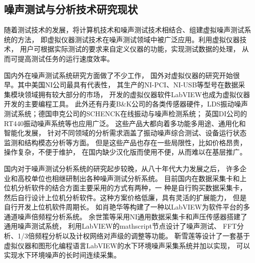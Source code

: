 \subsection{噪声测试与分析技术研究现状}
\begin{comment}
水下环境噪声数据采集装置对于水声试验来说是不可缺少的，因此设计
一套高性能的、能够适应水声信号特点的数据采集
系统十分必要。水声信号在水中传播时，水中的自然
环境极其复杂，要求所采用的数据采集器能够适应水下恶劣的自然环境，不但具有较大的动态范围，
所采集信号的幅度范围要尽可能宽，而且试验现场的数据量很大，常常需要多通道同步进行数据采集，
这样，对数据采集器提出了很高的要求。另外，从节约成本的角度考虑，又要求所采用的系统应该具有
一定的通用性和灵活的扩展能力。文中所要完成的
工作正是基于这一目的而展开的。

随着测试技术的发展，目前对传统的复杂仪器，分析方法的依赖性在减少，而正在流行着一种 
将计算机技术和噪声测试技术相结合、组建虚拟噪 
声测试系统的方法，即将虚拟仪器技术的测试技术 
引到噪声测试领域中，借助计算机软件技术来设计 
噪声分析软件。


\end{comment}
随着测试技术的发展，将计算机技术和噪声测试技术相结合、组建虚拟噪声测试系统的方法，
即虚拟仪器测试技术在噪声测试领域中被广泛应用\cite{yu2018}。利用虚拟仪器技术，
用户可根据实际测试的要求来自定义仪器的功能，实现测试数据的处理，
从而可提高测试任务的运行速度效率\cite{tang2021}。

国内外在噪声测试系统研究方面做了不少工作，
国外对虚拟仪器的研究开始很早。其中美国NI公司最具有代表性，
其生产的NI-PCI、NI-USB等型号在数据采集模块领域拥有较大部分的市场，
开发的虚拟仪器软件LabVIEW也成为虚拟仪器开发的主要编程工具\cite{2007Labview}。
此外还有丹麦B\&K公司的各类传感器硬件，LDS振动噪声测试系统；德国申克公司的SCHENCK在线振动与噪声检测系统；
英国DI公司的RT440振动噪声系统等也应用广泛\cite{dingJi2014}。
这些产品大都向着多功能多用途、通用化和智能化发展，
针对不同领域的分析需求涵盖了振动噪声综合测试、设备运行状态监测和结构模态分析等方面。
但是这些产品也存在一些局限性，比如价格昂贵，操作复杂，不便于维护，
在国内缺少汉化版而使用不便，从而难以在基层推广\cite{boMeasurementSystemWind2011}。

国内对于噪声测试分析系统的研究起步较晚，从八十年代大力发展之后，
许多企业和高校单位也相继研制出各种噪声测试分析系统\cite{jiangJi2020,sun2020}。
目前国内在数据采集卡和上位机分析软件的结合方面主要采用的方式有两种，一
种是自行购买数据采集卡，然后自行设计上位机分析软件。这种方案价格低廉，具有灵活的扩展能力，
但是自行开发上位机软件周期长。
如肖艳华等\cite{xiaoJiYu2017}构建了一种以LabVIEW为软件平台的多通道噪声倍频程分析系统。
余世策等\cite{余世策2016基于虚拟仪器的噪声测试系统研发}采用NI通用数据采集卡和声压传感器搭建了通用噪声测试系统，
利用LabVIEW的mathscript节点设计了噪声测试、 FFT分析、1/3倍频程分析以及计权网络对声级的调整等功能。
靳雪莲等\cite{jinxuelian2010}设计了一套基于虚拟仪器和图形化编程语言LabVIEW的水下环境噪声采集系统并加以实现，
可以实现水下环境噪声的长时间连续采集。

